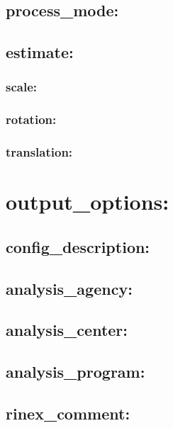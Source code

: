 \subsection{process\_mode:}

\subsection{estimate:}

\subsubsection{scale:}

\subsubsection{rotation:}

\subsubsection{translation:}



\section{output\_options:}

\subsection{config\_description:}

\subsection{analysis\_agency:}

\subsection{analysis\_center:}

\subsection{analysis\_program:}

\subsection{rinex\_comment:}



